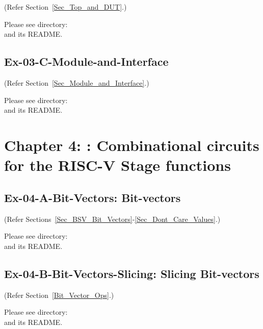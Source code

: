 (Refer Section~\ref{Sec_Top_and_DUT}.)

Please see directory:  \\
and its README.


\subsection*{Ex-03-C-Module-and-Interface}
\label{Ex-03-C-Module-and-Interface}

(Refer Section~\ref{Sec_Module_and_Interface}.)

Please see directory:  \\
and its README.


\hdivider

\section*{Chapter 4: {\BSV}: Combinational circuits for the RISC-V Stage functions}


\subsection*{Ex-04-A-Bit-Vectors: Bit-vectors}
\label{Ex-04-A-Bit-Vectors}

(Refer Sections~\ref{Sec_BSV_Bit_Vectors}-\ref{Sec_Dont_Care_Values}.)

Please see directory:  \\
and its README.


\subsection*{Ex-04-B-Bit-Vectors-Slicing: Slicing Bit-vectors}
\label{Ex-04-B-Bit-Vectors-Slicing}

(Refer Section~\ref{Bit_Vector_Ops}.)

Please see directory:  \\
and its README.

